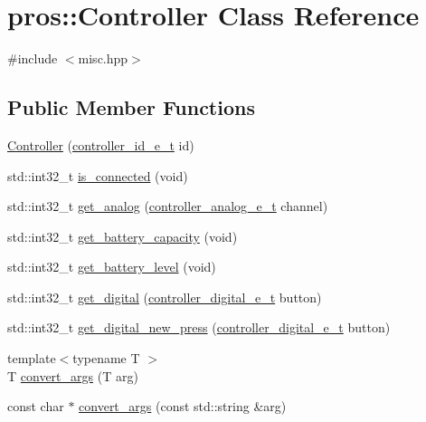 \hypertarget{classpros_1_1Controller}{}\section{pros\+:\+:Controller Class Reference}
\label{classpros_1_1Controller}


{\ttfamily \#include $<$misc.\+hpp$>$}

\subsection*{Public Member Functions}
\begin{DoxyCompactItemize}
\item 
\hyperlink{classpros_1_1Controller_ae9d9ead11894048b383e9e82ef46d5ad}{Controller} (\hyperlink{misc_8h_af1323f00203099060d46f722b1fbd460}{controller\+\_\+id\+\_\+e\+\_\+t} id)
\item 
std\+::int32\+\_\+t \hyperlink{classpros_1_1Controller_a1a013e9cf1979487f2daabcd729d3ecb}{is\+\_\+connected} (void)
\item 
std\+::int32\+\_\+t \hyperlink{classpros_1_1Controller_ace3038684aa3cf14f06279c54eeb1105}{get\+\_\+analog} (\hyperlink{misc_8h_a8bdd0963e2bc0d4fbe03435eee8a5ca5}{controller\+\_\+analog\+\_\+e\+\_\+t} channel)
\item 
std\+::int32\+\_\+t \hyperlink{classpros_1_1Controller_a7d85ecacfd46161ddb2be08d856ca130}{get\+\_\+battery\+\_\+capacity} (void)
\item 
std\+::int32\+\_\+t \hyperlink{classpros_1_1Controller_a8fd8b131f13f2f7702b5299dab82fdaf}{get\+\_\+battery\+\_\+level} (void)
\item 
std\+::int32\+\_\+t \hyperlink{classpros_1_1Controller_aec180b0f1700915007de2b7855070c80}{get\+\_\+digital} (\hyperlink{misc_8h_a8c380ff02828ee53954bc0ce274253ed}{controller\+\_\+digital\+\_\+e\+\_\+t} button)
\item 
std\+::int32\+\_\+t \hyperlink{classpros_1_1Controller_a9dc7dc6028431d3f8f9aff0fc7a4bed6}{get\+\_\+digital\+\_\+new\+\_\+press} (\hyperlink{misc_8h_a8c380ff02828ee53954bc0ce274253ed}{controller\+\_\+digital\+\_\+e\+\_\+t} button)
\item 
{\footnotesize template$<$typename T $>$ }\\T \hyperlink{classpros_1_1Controller_ae0a289e9e55e8f861591af1a6407a0f8}{convert\+\_\+args} (T arg)
\item 
const char $\ast$ \hyperlink{classpros_1_1Controller_a80ab1bf077cfe15fa9b7c4cba27428ef}{convert\+\_\+args} (const std\+::string \&arg)

\end{DoxyCompactItemize}
